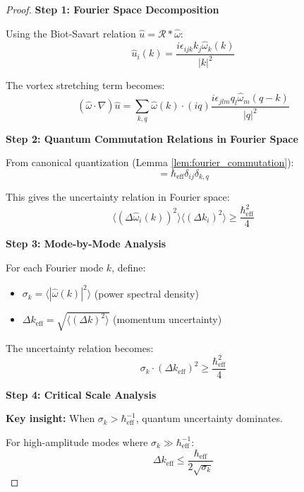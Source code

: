 \documentclass[11pt,a4paper]{article}
\theoremstyle{definition}
\theoremstyle{remark}
\newcommand{\heff}{\hbar_{\text{eff}}}
\newcommand{\omegahat}{\hat{\omega}}
\newcommand{\uhat}{\hat{u}}
\newcommand{\avg}[1]{\langle #1 \rangle}
\begin{document}
\begin{proof}
\textbf{Step 1: Fourier Space Decomposition}

Using the Biot-Savart relation $\uhat = \mathcal{R} * \omegahat$:
\begin{equation}
\uhat_i(k) = \frac{i\epsilon_{ijk} k_j \omegahat_k(k)}{|k|^2}
\label{eq:biot_savart_fourier}
\end{equation}

The vortex stretching term becomes:
\begin{equation}
(\omegahat \cdot \nabla)\uhat = \sum_{k,q} \omegahat(k) \cdot (iq) \frac{i\epsilon_{jlm} q_l \omegahat_m(q-k)}{|q|^2}
\label{eq:stretching_fourier}
\end{equation}

\textbf{Step 2: Quantum Commutation Relations in Fourier Space}

From canonical quantization (Lemma \ref{lem:fourier_commutation}):
\begin{equation}
[\omegahat_i(k), \omegahat_j^\dagger(q)] = \heff \delta_{ij} \delta_{k,q}
\label{eq:fourier_comm_proof}
\end{equation}

This gives the uncertainty relation in Fourier space:
\begin{equation}
\avg{(\Delta \omegahat_i(k))^2} \avg{(\Delta k_i)^2} \geq \frac{\heff^2}{4}
\label{eq:uncertainty_fourier}
\end{equation}

\textbf{Step 3: Mode-by-Mode Analysis}

For each Fourier mode $k$, define:
\begin{itemize}
    \item $\sigma_k = \avg{|\omegahat(k)|^2}$ (power spectral density)
    \item $\Delta k_{\text{eff}} = \sqrt{\avg{(\Delta k)^2}}$ (momentum uncertainty)
\end{itemize}

The uncertainty relation becomes:
\begin{equation}
\sigma_k \cdot (\Delta k_{\text{eff}})^2 \geq \frac{\heff^2}{4}
\label{eq:mode_uncertainty}
\end{equation}

\textbf{Step 4: Critical Scale Analysis}

\textbf{Key insight:} When $\sigma_k > \heff^{-1}$, quantum uncertainty dominates.

For high-amplitude modes where $\sigma_k \gg \heff^{-1}$:
\begin{equation}
\Delta k_{\text{eff}} \leq \frac{\heff}{2\sqrt{\sigma_k}}
\label{eq:critical_scale}
\end{equation}


\end{proof}
\end{document}
